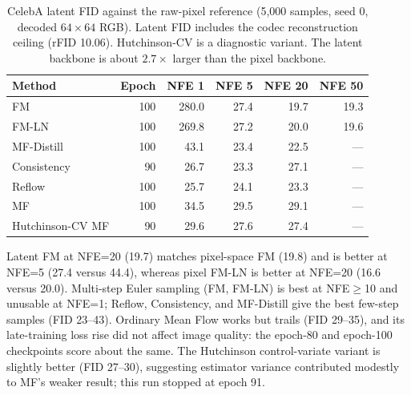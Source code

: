 \begin{table}[htbp]\centering
\caption{CelebA latent FID against the raw-pixel reference (5{,}000 samples,
  seed 0, decoded $64\times64$ RGB). Latent FID includes the codec
  reconstruction ceiling (rFID 10.06). Hutchinson-CV is a diagnostic variant.
  The latent backbone is about $2.7\times$ larger than the pixel backbone.}
  \label{tab:latent-rescored}
\begin{tabular}{lrrrrr}\toprule
Method & Epoch & NFE 1 & NFE 5 & NFE 20 & NFE 50\\\midrule
FM & 100 & 280.0 & 27.4 & 19.7 & 19.3\\
FM-LN & 100 & 269.8 & 27.2 & 20.0 & 19.6\\
MF-Distill & 100 & 43.1 & 23.4 & 22.5 & ---\\
Consistency & 90 & 26.7 & 23.3 & 27.1 & ---\\
Reflow & 100 & 25.7 & 24.1 & 23.3 & ---\\
MF & 100 & 34.5 & 29.5 & 29.1 & ---\\
Hutchinson-CV MF & 90 & 29.6 & 27.6 & 27.4 & ---\\\bottomrule
\end{tabular}\end{table}

Latent FM at NFE=20 (19.7) matches pixel-space FM (19.8) and is better at NFE=5
(27.4 versus 44.4), whereas pixel FM-LN is better at NFE=20 (16.6 versus 20.0).
Multi-step Euler sampling (FM, FM-LN) is best at NFE$\geq$10 and unusable at
NFE=1; Reflow, Consistency, and MF-Distill give the best few-step samples
(FID 23--43). Ordinary Mean Flow works but trails (FID 29--35), and its
late-training loss rise did not affect image quality: the epoch-80 and
epoch-100 checkpoints score about the same. The Hutchinson control-variate
variant is slightly better (FID 27--30), suggesting estimator variance
contributed modestly to MF's weaker result; this run stopped at epoch 91.
